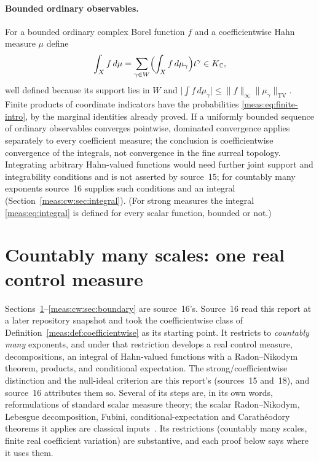 \documentclass[11pt]{article}
\numberwithin{equation}{section}
\theoremstyle{definition}
\theoremstyle{remark}
\newcommand{\C}{\mathbb C}
\newcommand{\KC}{K_{\C}}
\newcommand{\TV}{\mathrm{TV}}
\newcommand{\norm}[1]{\lVert#1\rVert}
\newcommand{\abs}[1]{\lvert#1\rvert}
\begin{document}
\paragraph{Bounded ordinary observables.} For a bounded ordinary complex Borel
function $f$ and a coefficientwise Hahn measure $\mu$ define
\begin{equation}\label{meas:eq:coef-integral}
 \int_Xf\,d\mu=\sum_{\gamma\in W}\Bigl(\int_Xf\,d\mu_\gamma\Bigr)t^\gamma\in\KC ,
\end{equation}
well defined because its support lies in $W$ and
$\abs{\int f\,d\mu_\gamma}\le\norm f_\infty\norm{\mu_\gamma}_\TV$. Finite products of
coordinate indicators have the probabilities \eqref{meas:eq:finite-intro}, by the
marginal identities already proved. If a uniformly bounded sequence of ordinary
observables converges pointwise, dominated convergence applies separately to
every coefficient measure; the conclusion is coefficientwise convergence of the
integrals, not convergence in the fine surreal topology. Integrating arbitrary
Hahn-valued functions would need further joint support and integrability
conditions and is not asserted by source~15; for countably many exponents
source~16 supplies such conditions and an integral
(Section~\ref{meas:cw:sec:integral}). (For strong measures the integral
\eqref{meas:eq:integral} is defined for every scalar function, bounded or not.)

\section{Countably many scales: one real control measure}
\label{meas:cw:sec:control}

Sections~\ref{meas:cw:sec:control}--\ref{meas:cw:sec:boundary} are source~16's.
Source~16 read this report at a later repository snapshot and took the
coefficientwise class of Definition~\ref{meas:def:coefficientwise} as its
starting point. It restricts to \emph{countably many} exponents, and under that
restriction develops a real control measure, decompositions, an integral of
Hahn-valued functions with a Radon--Nikodym theorem, products, and conditional
expectation. The strong/coefficientwise distinction and the null-ideal
criterion are this report's (sources~15 and~18), and source~16 attributes them
so. Several of its steps are, in its own words, reformulations of standard
scalar measure theory; the scalar Radon--Nikodym, Lebesgue decomposition,
Fubini, conditional-expectation and Carath\'eodory theorems it applies are
classical inputs~\cite{Bogachev}. Its restrictions (countably many scales,
finite real coefficient variation) are substantive, and each proof below says
where it uses them.
\end{document}

